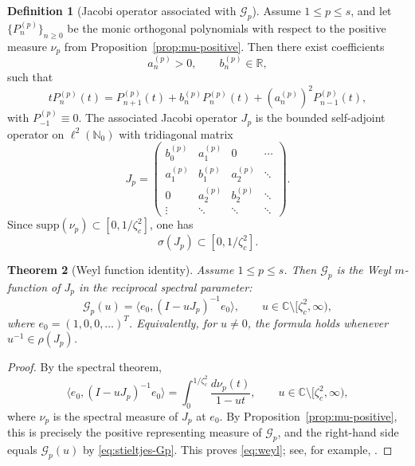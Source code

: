 \documentclass[11pt]{amsart}
\numberwithin{equation}{section}
\theoremstyle{plain}
\newtheorem{theorem}{Theorem}[section]
\theoremstyle{definition}
\newtheorem{definition}[theorem]{Definition}
\theoremstyle{remark}
\newcommand{\CC}{\mathbb{C}}
\newcommand{\R}{\mathbb{R}}
\newcommand{\NN}{\mathbb{N}}
\begin{document}
\begin{definition}[Jacobi operator associated with \(\mathcal G_p\)]
	\label{def:jacobi}
	Assume \(1\le p\le s\), and let \(\{P_n^{(p)}\}_{n\ge0}\) be the monic
	orthogonal polynomials with respect to the positive measure \(\nu_p\) from
	Proposition~\ref{prop:mu-positive}. Then there exist coefficients
	\[
		a_n^{(p)}>0,
		\qquad
		b_n^{(p)}\in\R,
	\]
	such that
	\begin{equation}\label{eq:three-term}
		tP_n^{(p)}(t)
		=
		P_{n+1}^{(p)}(t)+b_n^{(p)}P_n^{(p)}(t)+(a_n^{(p)})^2P_{n-1}^{(p)}(t),
	\end{equation}
	with \(P_{-1}^{(p)}\equiv0\). The associated Jacobi operator \(J_p\) is the
	bounded self-adjoint operator on \(\ell^2(\NN_0)\) with tridiagonal matrix
	\[
		J_p=
		\begin{pmatrix}
			b_0^{(p)} & a_1^{(p)} & 0         & \cdots \\
			a_1^{(p)} & b_1^{(p)} & a_2^{(p)} & \ddots \\
			0         & a_2^{(p)} & b_2^{(p)} & \ddots \\
			\vdots    & \ddots    & \ddots    & \ddots
		\end{pmatrix}.
	\]
	Since \(\textrm{supp}(\nu_p)\subset[0,1/\zeta_c^2]\), one has
	\[
		\sigma(J_p)\subset[0,1/\zeta_c^2].
	\]
\end{definition}

\begin{theorem}[Weyl function identity]
	\label{thm:weyl}
	Assume \(1\le p\le s\). Then \(\mathcal G_p\) is the Weyl \(m\)-function of
	\(J_p\) in the reciprocal spectral parameter:
	\begin{equation}\label{eq:weyl}
		\mathcal G_p(u)
		=
		\langle e_0,(I-uJ_p)^{-1}e_0\rangle,
		\qquad
		u\in\CC\setminus[\zeta_c^2,\infty),
	\end{equation}
	where \(e_0=(1,0,0,\dots)^T\). Equivalently, for \(u\neq0\), the formula
	holds whenever \(u^{-1}\in\rho(J_p)\).
\end{theorem}

\begin{proof}
	By the spectral theorem,
	\[
		\langle e_0,(I-uJ_p)^{-1}e_0\rangle
		=
		\int_0^{1/\zeta_c^2}\frac{d\nu_p(t)}{1-ut},
		\qquad
		u\in\CC\setminus[\zeta_c^2,\infty),
	\]
	where \(\nu_p\) is the spectral measure of \(J_p\) at \(e_0\). By
	Proposition~\ref{prop:mu-positive}, this is precisely the positive
	representing measure of \(\mathcal G_p\), and the right-hand side equals
	\(\mathcal G_p(u)\) by \eqref{eq:stieltjes-Gp}. This proves
	\eqref{eq:weyl}; see, for example, \cite[Ch.~III]{Akhiezer1965}.
\end{proof}
\end{document}
